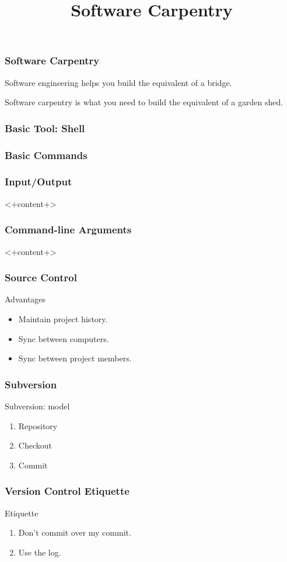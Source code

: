 
\title{Software Carpentry}


\begin{frame}[fragile]
\frametitle{Software Carpentry}

Software engineering helps you build the equivalent of a bridge.

Software carpentry is what you need to build the equivalent of a garden shed.

\end{frame}

\begin{frame}[fragile]
\frametitle{Basic Tool: Shell}

\end{frame}

\begin{frame}[fragile]
\frametitle{Basic Commands}

\end{frame}


\begin{frame}[fragile]
\frametitle{Input/Output}
<+content+>
\end{frame}

\begin{frame}[fragile]
\frametitle{Command-line Arguments}
<+content+>
\end{frame}

\begin{frame}[fragile]
\frametitle{Source Control}
\begin{block}{Advantages}
\begin{itemize}
\item Maintain project history.
\item Sync between computers.
\item Sync between project members.
\end{itemize}
\end{block}
\end{frame}

\begin{frame}[fragile]
\frametitle{Subversion}
\begin{block}{Subversion: model}
\begin{enumerate}
\item Repository
\item Checkout
\item Commit
\end{enumerate}
\end{block}
\end{frame}

\begin{frame}[fragile]
\frametitle{Version Control Etiquette}
\begin{block}{Etiquette}
\begin{enumerate}
\item Don't commit over my commit.
\item Use the log.
\end{enumerate}
\end{block}
\end{frame}


